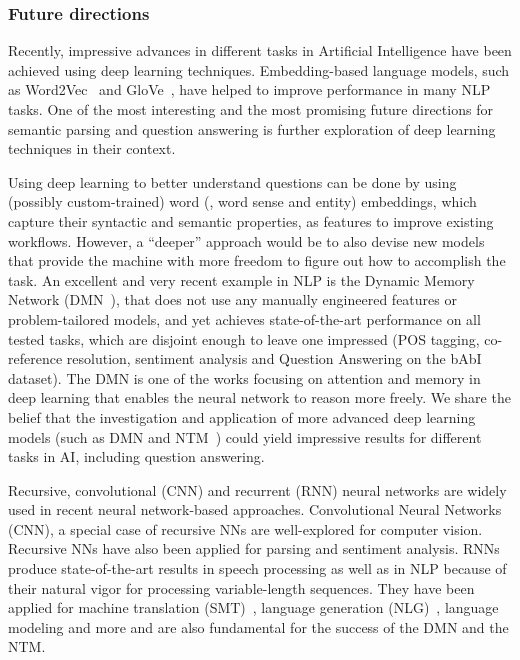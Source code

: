 \subsubsection{Future directions}
Recently, impressive advances in different tasks in Artificial Intelligence have been achieved using deep learning techniques.
Embedding-based language models, such as Word2Vec~\cite{mikolov1,mikolov2} and GloVe~\cite{glove}, have helped to improve performance in many NLP tasks. 
One of the most interesting and the most promising future directions for semantic parsing and question answering is further exploration of deep learning techniques in their context.


Using deep learning to better understand questions can be done by using (possibly custom-trained) word (, word sense and entity) embeddings, which capture their syntactic and semantic properties, as features to improve existing workflows.
However, a ``deeper'' approach would be to also devise new models that provide the machine with more freedom to figure out how to accomplish the task.
An excellent and very recent example in NLP is the Dynamic Memory Network (DMN~\cite{dmn}), that does not use any manually engineered features or problem-tailored models, and yet achieves state-of-the-art performance on all tested tasks, which are disjoint enough to leave one impressed (POS tagging, co-reference resolution, sentiment analysis and Question Answering on the bAbI dataset).
The DMN is one of the works focusing on attention and memory in deep learning that enables the neural network to reason more freely.
We share the belief that the investigation and application of more advanced deep learning models (such as DMN and NTM~\cite{ntm}) could yield impressive results for different tasks in AI, including question answering.

Recursive, convolutional (CNN) and recurrent (RNN) neural networks are widely used in recent neural network-based approaches.
Convolutional Neural Networks (CNN), a special case of recursive NNs are well-explored for computer vision.
Recursive NNs have also been applied for parsing and sentiment analysis. 
RNNs produce state-of-the-art results in speech processing as well as in NLP because of their natural vigor for processing variable-length sequences.
They have been applied for machine translation (SMT)~\cite{smtrnn}, language generation (NLG)~\cite{nlgrnn}, language modeling and more and are also fundamental for the success of the DMN and the NTM.

